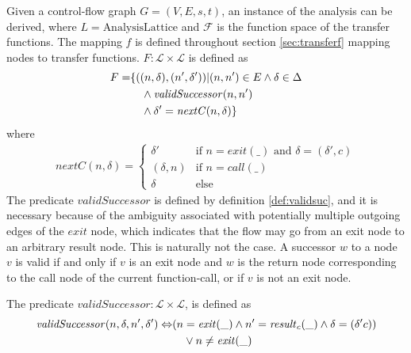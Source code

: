 Given a control-flow graph $G = (V,E,s,t)$, an instance of the analysis can be derived, where $L = \text{AnalysisLattice}$ and $\mathcal{F}$ is the function space of the transfer functions. The mapping $f$ is defined throughout section \ref{sec:transferf} mapping nodes to transfer functions. $F : \mathcal{L} \times \mathcal{L}$ is defined as 
\begin{align}
F = &\{((n, \delta), (n', \delta')) | (n,n') \in E \wedge\delta \in \Delta \notag\\
&\quad \wedge \mathit{validSuccessor}(n, n')\notag\\
&\quad \wedge  \delta' = \mathit{nextC}( n, \delta)\}
\end{align} 
where 
\begin{align}
\mathit{nextC}(n,\delta) = 
	\begin{cases}
		\delta' & \text{if $n = \mathit{exit(\_)}$ and $\delta = (\delta', c)$}\\
		(\delta, n) &\text{if }n=\mathit{call}(\_)\\
		\delta &\text{else} 
	\end{cases}
\end{align} The predicate $\mathit{validSuccessor}$ is defined by definition \ref{def:validsuc}, and it is necessary because of the ambiguity associated with potentially multiple outgoing edges of the $\mathit{exit}$ node, which indicates that the flow may go from an exit node to an arbitrary result node. This is naturally not the case. A successor $w$ to a node $v$ is valid if and only if $v$ is an exit node and $w$ is the return node corresponding to the call node of the current function-call, or if $v$ is not an exit node.

\begin{definition}
\label{def:validsuc}
The predicate $\mathit{validSuccessor} : \mathcal{L} \times \mathcal{L}$, is defined as
\begin{align}
\mathit{validSuccessor}(n, \delta, n', \delta') \Leftrightarrow &(n = \mathit{exit}(\_) \wedge n' = \mathit{result}_c(\_) \wedge \delta  = (\delta' c)) \notag\\
&\quad\vee n \neq \mathit{exit}(\_)
\end{align}
\end{definition}


